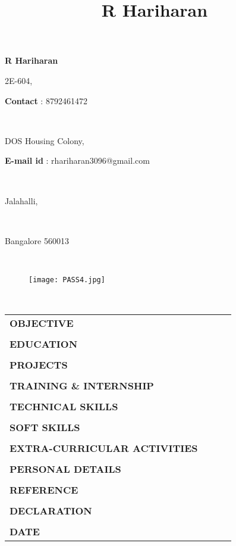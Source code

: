 \documentclass[a4paper,12pt,final]{article}
\title{R Hariharan}
\newcommand\textbox[1]{%
	\parbox{.500\textwidth}{#1}%
}
\begin{document}
	\begin{center}
		\bfseries \LARGE R Hariharan
	\end{center}
	\noindent\makebox[\linewidth]{\rule{\paperwidth}{0.4pt}}
	\noindent\textbox{\small 2E-604,\hfill}\textbox{\hfill \small \textbf{Contact} : 8792461472}\\	
	\noindent\textbox{\small DOS Housing Colony,\hfill}\textbox{\hfill \small \textbf{E-mail id} : rhariharan3096@gmail.com}\\	
	\noindent\textbox{\small Jalahalli,}\\
	\noindent\textbox{\small Bangalore 560013}\\	
	\begin{figure}[h]
		\noindent\textbox{\hfill}\textbox{\hfill \texttt{[image: PASS4.jpg]}}
	\end{figure}\\	
	\begin{tabular}{L{4cm} cc l}
		\textbf{\large OBJECTIVE} &&& \\\\
		\textbf{\large EDUCATION} &&& \\\\
		\textbf{\large PROJECTS} &&& \\\\
		\textbf{\large TRAINING \& INTERNSHIP} &&& \\\\
		\textbf{\large TECHNICAL SKILLS} &&& \\\\
		\textbf{\large SOFT SKILLS} &&& \\\\
		\textbf{\large EXTRA-CURRICULAR ACTIVITIES} &&& \\\\
		\textbf{\large PERSONAL DETAILS} &&& \\\\
		\textbf{\large REFERENCE} &&& \\\\
		\textbf{\large DECLARATION} &&& \\\\
		\textbf{\large DATE} &&& \\
	\end{tabular}
\end{document}
